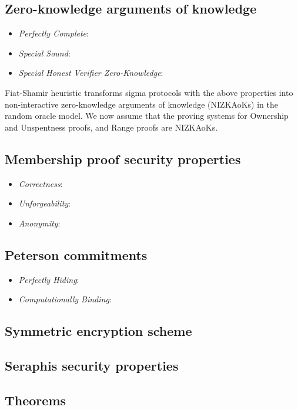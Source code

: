 \documentclass{article}
\begin{document}
\subsection{Zero-knowledge arguments of knowledge}
\begin{itemize}
    \item \textit{Perfectly Complete}:
    \item \textit{Special Sound}:
    \item \textit{Special Honest Verifier Zero-Knowledge}:
\end{itemize}
Fiat-Shamir heuristic \cite{fiat-shamir} transforms sigma protocols with the above properties into non-interactive zero-knowledge arguments of knowledge (NIZKAoKs) in the random oracle model. We now assume that the proving systems for Ownership and Unspentness proofs, and Range proofs are NIZKAoKs.
\subsection{Membership proof security properties}
\begin{itemize}
    \item \textit{Correctness}:
    \item \textit{Unforgeability}:
    \item \textit{Anonymity}:
\end{itemize}
\subsection{Peterson commitments}
\begin{itemize}
    \item \textit{Perfectly Hiding}:
    \item \textit{Computationally Binding}:
\end{itemize}
\subsection{Symmetric encryption scheme}
\subsection{Seraphis security properties}
\subsection{Theorems}



\end{document}
